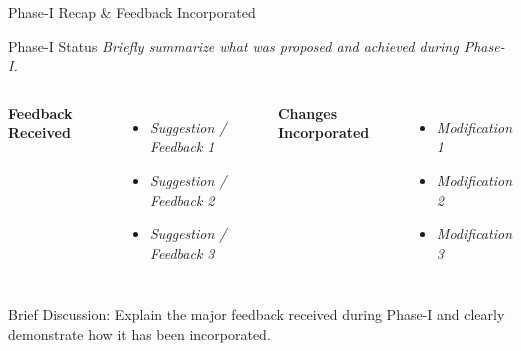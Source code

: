 \documentclass[aspectratio=169,11pt]{beamer}
\newcommand{\smallnote}[1]{%
\vspace{0.08cm}
{\scriptsize\color{GEUGrey}#1}
}
\newcommand{\placeholder}[1]{%
\textit{\color{GEUGrey}#1}
}
\begin{document}
\begin{frame}{Phase-I Recap \& Feedback Incorporated}

\begin{block}{Phase-I Status}
\placeholder{
Briefly summarize what was proposed and achieved during Phase-I.
}
\end{block}

\vspace{2mm}

\begin{columns}[T,totalwidth=\textwidth]


\textbf{\color{GEUBlue}Feedback Received}

\begin{itemize}\itemsep2pt
\item \placeholder{Suggestion / Feedback 1}
\item \placeholder{Suggestion / Feedback 2}
\item \placeholder{Suggestion / Feedback 3}
\end{itemize}


\textbf{\color{GEUBlue}Changes Incorporated}

\begin{itemize}\itemsep2pt
\item \placeholder{Modification 1}
\item \placeholder{Modification 2}
\item \placeholder{Modification 3}
\end{itemize}

\end{columns}

\vfill

\smallnote{
Brief Discussion: Explain the major feedback received during Phase-I
and clearly demonstrate how it has been incorporated.
}

\end{frame}
\end{document}
